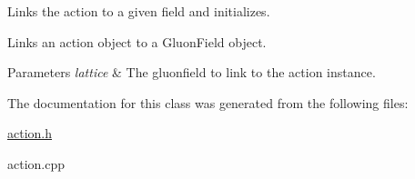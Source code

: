 Links the action to a given field and initializes. 

Links an action object to a Gluon\+Field object.


\begin{DoxyParams}{Parameters}
{\em lattice} & The gluonfield to link to the action instance. \\
\hline
\end{DoxyParams}


The documentation for this class was generated from the following files\+:\begin{DoxyCompactItemize}
\item 
\hyperlink{action_8h}{action.\+h}\item 
action.\+cpp\end{DoxyCompactItemize}
